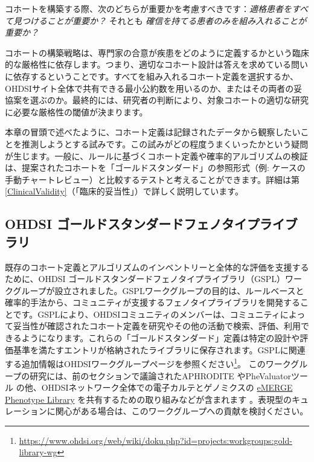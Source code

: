 \documentclass[
  11pt]{book}
\theoremstyle{definition}
\theoremstyle{definition}
\theoremstyle{definition}
\theoremstyle{definition}
\theoremstyle{remark}
\begin{document}
コホートを構築する際、次のどちらが重要かを考慮すべきです：\emph{適格患者をすべて見つけることが重要か？} それとも \emph{確信を持てる患者のみを組み入れることが重要か？}

コホートの構築戦略は、専門家の合意が疾患をどのように定義するかという臨床的な厳格性に依存します。つまり、適切なコホート設計は答えを求めている問いに依存するということです。すべてを組み入れるコホート定義を選択するか、OHDSIサイト全体で共有できる最小公約数を用いるのか、またはその両者の妥協案を選ぶのか。最終的には、研究者の判断により、対象コホートの適切な研究に必要な厳格性の閾値が決まります。

本章の冒頭で述べたように、コホート定義は記録されたデータから観察したいことを推測しようとする試みです。この試みがどの程度うまくいったかという疑問が生じます。一般に、ルールに基づくコホート定義や確率的アルゴリズムの検証は、提案されたコホートを「ゴールドスタンダード」の参照形式（例: ケースの手動チャートレビュー）と比較するテストと考えることができます。詳細は第 \ref{ClinicalValidity}（「臨床的妥当性」）で詳しく説明しています。

\subsection{OHDSI ゴールドスタンダードフェノタイプライブラリ}\label{ohdsi-ux30b4ux30fcux30ebux30c9ux30b9ux30bfux30f3ux30c0ux30fcux30c9ux30d5ux30a7ux30ceux30bfux30a4ux30d7ux30e9ux30a4ux30d6ux30e9ux30ea}

既存のコホート定義とアルゴリズムのインベントリーと全体的な評価を支援するために、OHDSI ゴールドスタンダードフェノタイプライブラリ（GSPL）ワークグループが設立されました。GSPLワークグループの目的は、ルールベースと確率的手法から、コミュニティが支援するフェノタイプライブラリを開発することです。GSPLにより、OHDSIコミュニティのメンバーは、コミュニティによって妥当性が確認されたコホート定義を研究やその他の活動で検索、評価、利用できるようになります。これらの「ゴールドスタンダード」定義は特定の設計や評価基準を満たすエントリが格納されたライブラリに保存されます。GSPLに関連する追加情報はOHDSIワークグループページを参照ください\footnote{\url{https://www.ohdsi.org/web/wiki/doku.php?id=projects:workgroups:gold-library-wg}}。 このワークグループの研究には、前のセクションで議論されたAPHRODITE \citep{Banda2017APHRODITE} やPheValuatorツール \citep{Swerdel2019phevaluator} の他、OHDSIネットワーク全体での電子カルテとゲノミクスの \href{https://emerge.mc.vanderbilt.edu/}{eMERGE} \href{https://phekb.org/phenotypes}{Phenotype Library} を共有するための取り組みなどが含まれます \citep{Hripcsak2019eMERGE}。表現型のキュレーションに関心がある場合は、このワークグループへの貢献を検討ください。 
\end{document}
